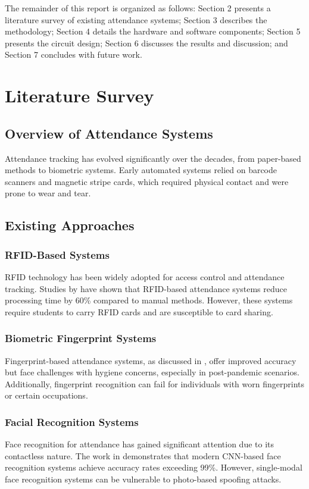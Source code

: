 \documentclass[12pt,a4paper]{article}
\begin{document}
The remainder of this report is organized as follows: Section 2 presents a literature survey of existing attendance systems; Section 3 describes the methodology; Section 4 details the hardware and software components; Section 5 presents the circuit design; Section 6 discusses the results and discussion; and Section 7 concludes with future work.

\pagebreak

\section{Literature Survey}

\subsection{Overview of Attendance Systems}
Attendance tracking has evolved significantly over the decades, from paper-based methods to biometric systems. Early automated systems relied on barcode scanners and magnetic stripe cards, which required physical contact and were prone to wear and tear.

\subsection{Existing Approaches}

\subsubsection{RFID-Based Systems}
RFID technology has been widely adopted for access control and attendance tracking. Studies by \cite{RFID_attendance} have shown that RFID-based attendance systems reduce processing time by 60\% compared to manual methods. However, these systems require students to carry RFID cards and are susceptible to card sharing.

\subsubsection{Biometric Fingerprint Systems}
Fingerprint-based attendance systems, as discussed in \cite{fingerprint_system}, offer improved accuracy but face challenges with hygiene concerns, especially in post-pandemic scenarios. Additionally, fingerprint recognition can fail for individuals with worn fingerprints or certain occupations.

\subsubsection{Facial Recognition Systems}
Face recognition for attendance has gained significant attention due to its contactless nature. The work in \cite{face_recognition_survey} demonstrates that modern CNN-based face recognition systems achieve accuracy rates exceeding 99\%. However, single-modal face recognition systems can be vulnerable to photo-based spoofing attacks.
\end{document}
